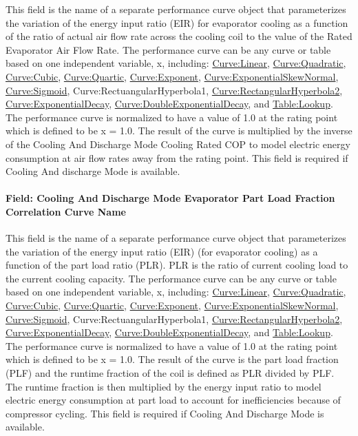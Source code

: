 This field is the name of a separate performance curve object that parameterizes the variation of the energy input ratio (EIR) for evaporator cooling as a function of the ratio of actual air flow rate across the cooling coil to the value of the Rated Evaporator Air Flow Rate. The performance curve can be any curve or table based on one independent variable, x, including: \hyperref[curvelinear]{Curve:Linear}, \hyperref[curvequadratic]{Curve:Quadratic}, \hyperref[curvecubic]{Curve:Cubic}, \hyperref[curvequartic]{Curve:Quartic}, \hyperref[curveexponent]{Curve:Exponent}, \hyperref[curveexponentialskewnormal]{Curve:ExponentialSkewNormal}, \hyperref[curvesigmoid]{Curve:Sigmoid}, Curve:RectuangularHyperbola1, \hyperref[curverectangularhyperbola2]{Curve:RectangularHyperbola2}, \hyperref[curveexponentialdecay]{Curve:ExponentialDecay}, \hyperref[curvedoubleexponentialdecay]{Curve:DoubleExponentialDecay}, and \hyperref[tablelookup]{Table:Lookup}. The performance curve is normalized to have a value of 1.0 at the rating point which is defined to be x = 1.0. The result of the curve is multiplied by the inverse of the Cooling And Discharge Mode Cooling Rated COP to model electric energy consumption at air flow rates away from the rating point. This field is required if Cooling And discharge Mode is available.

\paragraph{Field: Cooling And Discharge Mode Evaporator Part Load Fraction Correlation Curve Name}\label{field-cooling-and-discharge-mode-evaporator-part-load-fraction-correlation-curve-name}

This field is the name of a separate performance curve object that parameterizes the variation of the energy input ratio (EIR) (for evaporator cooling) as a function of the part load ratio (PLR). PLR is the ratio of current cooling load to the current cooling capacity. The performance curve can be any curve or table based on one independent variable, x, including: \hyperref[curvelinear]{Curve:Linear}, \hyperref[curvequadratic]{Curve:Quadratic}, \hyperref[curvecubic]{Curve:Cubic}, \hyperref[curvequartic]{Curve:Quartic}, \hyperref[curveexponent]{Curve:Exponent}, \hyperref[curveexponentialskewnormal]{Curve:ExponentialSkewNormal}, \hyperref[curvesigmoid]{Curve:Sigmoid}, Curve:RectuangularHyperbola1, \hyperref[curverectangularhyperbola2]{Curve:RectangularHyperbola2}, \hyperref[curveexponentialdecay]{Curve:ExponentialDecay}, \hyperref[curvedoubleexponentialdecay]{Curve:DoubleExponentialDecay}, and \hyperref[tablelookup]{Table:Lookup}. The performance curve is normalized to have a value of 1.0 at the rating point which is defined to be x = 1.0. The result of the curve is the part load fraction (PLF) and the runtime fraction of the coil is defined as PLR divided by PLF. The runtime fraction is then multiplied by the energy input ratio to model electric energy consumption at part load to account for inefficiencies because of compressor cycling. This field is required if Cooling And Discharge Mode is available.

